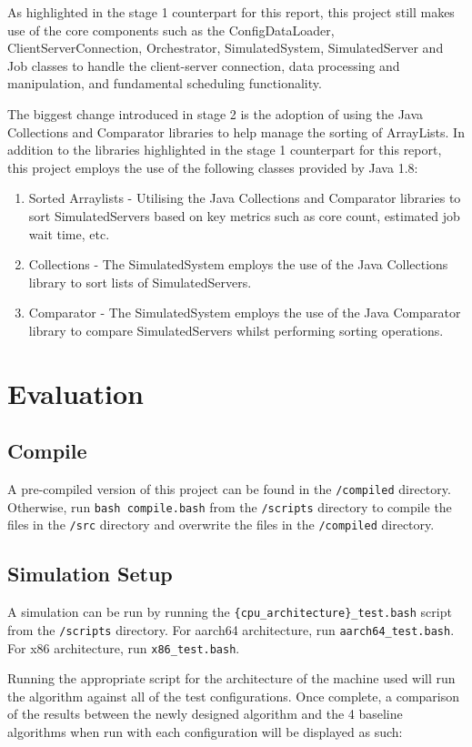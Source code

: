 \documentclass[a4paper]{article}
\begin{document}
As highlighted in the stage 1 counterpart for this report, this project still makes use of the core components such as the ConfigDataLoader, ClientServerConnection, Orchestrator, SimulatedSystem, SimulatedServer and Job classes to handle the client-server connection, data processing and manipulation, and fundamental scheduling functionality. 

The biggest change introduced in stage 2 is the adoption of using the Java Collections and Comparator libraries to help manage the sorting of ArrayLists. In addition to the libraries highlighted in the stage 1 counterpart for this report, this project employs the use of the following classes provided by Java 1.8:
\begin{enumerate}
  \item Sorted Arraylists - Utilising the Java Collections and Comparator libraries to sort SimulatedServers based on key metrics such as core count, estimated job wait time, etc.
  \item Collections - The SimulatedSystem employs the use of the Java Collections library to sort lists of SimulatedServers.
  \item Comparator - The SimulatedSystem employs the use of the Java Comparator library to compare SimulatedServers whilst performing sorting operations.
\end{enumerate}

\section{Evaluation}
\label{sec:section5}
\subsection{Compile}
A pre-compiled version of this project can be found in the \verb|/compiled| directory. Otherwise, run \verb|bash compile.bash| from the \verb|/scripts| directory to compile the files in the \verb|/src| directory and overwrite the files in the \verb|/compiled| directory.

\subsection{Simulation Setup}
A simulation can be run by running the \verb|{cpu_architecture}_test.bash| script from the \verb|/scripts| directory. For aarch64 architecture, run \verb|aarch64_test.bash|. For x86 architecture, run \verb|x86_test.bash|.

Running the appropriate script for the architecture of the machine used will run the algorithm against all of the test configurations. Once complete, a comparison of the results between the newly designed algorithm and the 4 baseline algorithms when run with each configuration will be displayed as such:
\end{document}
